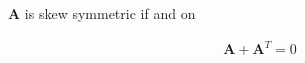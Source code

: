 \documentclass{article}
\begin{document}
	$\mathbf A$ is skew symmetric if and on
	
	\begin{align*}
		\mathbf A + \mathbf A^T = 0
	\end{align*}
	
\end{document}
